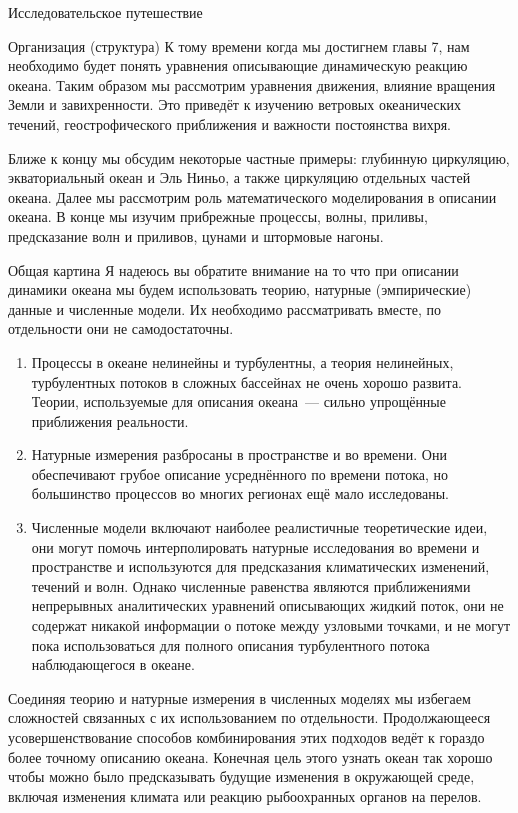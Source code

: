 \begin{chapter}{Исследовательское путешествие}
\begin{section}{Организация (структура)}
К тому времени когда мы достигнем главы 7, нам необходимо будет понять 
уравнения описывающие динамическую реакцию океана. Таким образом мы рассмотрим 
уравнения движения, влияние вращения Земли и завихренности. Это приведёт к 
изучению ветровых океанических течений, геострофического приближения и важности 
постоянства вихря.

Ближе к концу мы обсудим некоторые частные примеры: глубинную циркуляцию, 
экваториальный океан и Эль Ниньо, а также циркуляцию отдельных частей океана. 
Далее мы рассмотрим роль математического моделирования в описании океана. 
В конце мы изучим прибрежные процессы, волны, приливы, предсказание волн 
и приливов, цунами и штормовые нагоны.
\end{section}

\begin{section}{Общая картина}
Я надеюсь вы обратите внимание на то что при описании динамики океана мы 
будем использовать теорию, натурные (эмпирические) данные и численные модели. 
Их необходимо рассматривать вместе, по отдельности они не самодостаточны.

\begin{enumerate}
\item
Процессы в океане нелинейны и турбулентны, а теория нелинейных, турбулентных 
потоков в сложных бассейнах не очень хорошо развита. Теории, используемые 
для описания океана~--- сильно упрощённые приближения реальности. 

\item
Натурные измерения разбросаны в пространстве и во времени. Они обеспечивают 
грубое описание усреднённого по времени потока, но большинство процессов 
во многих регионах ещё мало исследованы. 

\item
Численные модели включают наиболее реалистичные теоретические идеи, они могут 
помочь интерполировать натурные исследования во времени и пространстве 
и используются для предсказания климатических изменений, течений и волн. 
Однако численные равенства являются приближениями непрерывных аналитических 
уравнений описывающих жидкий поток, они не содержат никакой информации о 
потоке между узловыми точками, и не могут пока использоваться для полного 
описания турбулентного потока наблюдающегося в океане. 
\end{enumerate}

Соединяя теорию и натурные измерения в численных моделях мы избегаем 
сложностей связанных с их использованием по отдельности. Продолжающееся 
усовершенствование способов комбинирования этих подходов ведёт к гораздо 
более точному описанию океана. Конечная цель этого узнать океан так хорошо 
чтобы можно было предсказывать будущие изменения в окружающей среде, 
включая изменения климата или реакцию рыбоохранных органов на перелов.


\end{section}
\end{chapter}
